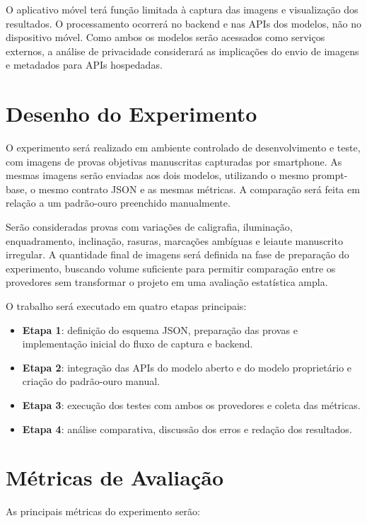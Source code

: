 O aplicativo móvel terá função limitada à captura das imagens e visualização dos resultados. O processamento ocorrerá no backend e nas APIs dos modelos, não no dispositivo móvel. Como ambos os modelos serão acessados como serviços externos, a análise de privacidade considerará as implicações do envio de imagens e metadados para APIs hospedadas.

\section{Desenho do Experimento}

O experimento será realizado em ambiente controlado de desenvolvimento e teste, com imagens de provas objetivas manuscritas capturadas por smartphone. As mesmas imagens serão enviadas aos dois modelos, utilizando o mesmo prompt-base, o mesmo contrato JSON e as mesmas métricas. A comparação será feita em relação a um padrão-ouro preenchido manualmente.

Serão consideradas provas com variações de caligrafia, iluminação, enquadramento, inclinação, rasuras, marcações ambíguas e leiaute manuscrito irregular. A quantidade final de imagens será definida na fase de preparação do experimento, buscando volume suficiente para permitir comparação entre os provedores sem transformar o projeto em uma avaliação estatística ampla.

O trabalho será executado em quatro etapas principais:

\begin{itemize}
    \item \textbf{Etapa 1}: definição do esquema JSON, preparação das provas e implementação inicial do fluxo de captura e backend.
    \item \textbf{Etapa 2}: integração das APIs do modelo aberto e do modelo proprietário e criação do padrão-ouro manual.
    \item \textbf{Etapa 3}: execução dos testes com ambos os provedores e coleta das métricas.
    \item \textbf{Etapa 4}: análise comparativa, discussão dos erros e redação dos resultados.
\end{itemize}

\section{Métricas de Avaliação}

As principais métricas do experimento serão:

